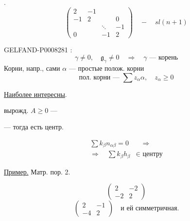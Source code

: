 .
\[
\begin{pmatrix}
2&-1&&\\
-1&2&&0\\
&&\ddots&-1\\
0&&-1&2
\end{pmatrix}
\quad-\quad sl(n+1)
\]


\begin{GelfandAdjacentEvidence}{GELFAND-P000828}{1}
:
\[
\gamma\ne0,\quad\mathfrak g_\gamma\ne0
\quad\Rightarrow\quad\gamma\text{ — корень}
\]
Корни, напр., сами \(\alpha\) — простые полож. корни
\[
\text{пол. корни — }\sum z_\alpha\alpha,\quad z_\alpha\ge0
\]

\uline{Наиболее интересны}.

вырожд. \(A\ge0\) —

— тогда есть центр.

\begin{equation*}
\begin{aligned}
\sum k_\beta n_{\alpha\beta}=0&\quad\Rightarrow\\
\Rightarrow\quad\sum k_\beta h_\beta&\in\text{ центру}
\end{aligned}\tag{26}
\end{equation*}

\uline{Пример.} Матр. пор. 2.

\begin{equation*}
\begin{pmatrix}2&-2\\-2&2\end{pmatrix}\tag{27}
\end{equation*}
\begin{equation*}
\begin{pmatrix}2&-1\\-4&2\end{pmatrix}
\quad\text{и ей симметричная.}\tag{28}
\end{equation*}

\end{GelfandAdjacentEvidence}
